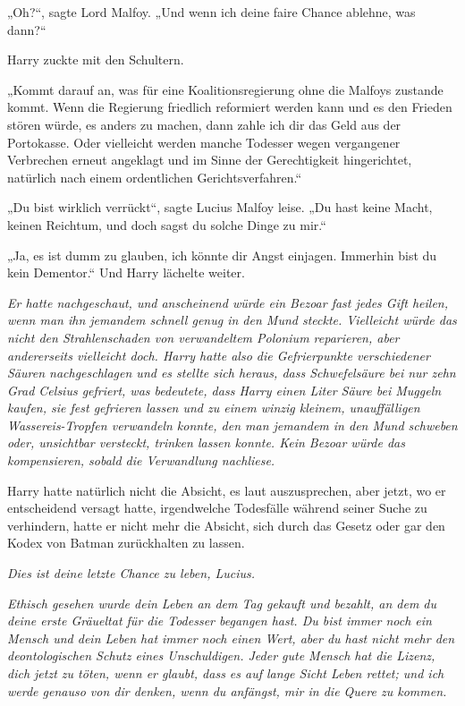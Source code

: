 {„Oh?“, sagte Lord Malfoy. „Und wenn ich deine faire Chance ablehne, was dann?“

Harry zuckte mit den Schultern.

„Kommt darauf an, was für eine Koalitionsregierung ohne die Malfoys zustande kommt. Wenn die Regierung friedlich reformiert werden kann und es den Frieden stören würde, es anders zu machen, dann zahle ich dir das Geld aus der Portokasse. Oder vielleicht werden manche Todesser wegen vergangener Verbrechen erneut angeklagt und im Sinne der Gerechtigkeit hingerichtet, natürlich nach einem ordentlichen Gerichtsverfahren.“

„Du bist wirklich verrückt“, sagte Lucius Malfoy leise. „Du hast keine Macht, keinen Reichtum, und doch sagst du solche Dinge zu mir.“

„Ja, es ist dumm zu glauben, ich könnte dir Angst einjagen. Immerhin bist du kein Dementor.“ Und Harry lächelte weiter.

\emph{Er hatte nachgeschaut, und anscheinend würde ein Bezoar fast jedes Gift heilen, wenn man ihn jemandem schnell genug in den Mund steckte. Vielleicht würde das nicht den Strahlenschaden von verwandeltem Polonium reparieren, aber andererseits vielleicht doch. Harry hatte also die Gefrierpunkte verschiedener Säuren nachgeschlagen und es stellte sich heraus, dass Schwefelsäure bei nur zehn Grad Celsius gefriert, was bedeutete, dass Harry einen Liter Säure bei Muggeln kaufen, sie fest gefrieren lassen und zu einem winzig kleinem, unauffälligen Wassereis-Tropfen verwandeln konnte, den man jemandem in den Mund schweben oder, unsichtbar versteckt, trinken lassen konnte. Kein Bezoar würde das kompensieren, sobald die Verwandlung nachliese.}

Harry hatte natürlich nicht die Absicht, es laut auszusprechen, aber jetzt, wo er entscheidend versagt hatte, irgendwelche Todesfälle während seiner Suche zu verhindern, hatte er nicht mehr die Absicht, sich durch das Gesetz oder gar den Kodex von Batman zurückhalten zu lassen.

\emph{Dies ist deine letzte Chance zu leben, Lucius.}

\emph{Ethisch gesehen wurde dein Leben an dem Tag gekauft und bezahlt, an dem du deine erste Gräueltat für die Todesser begangen hast. Du bist immer noch ein Mensch und dein Leben hat immer noch einen Wert, aber du hast nicht mehr den deontologischen Schutz eines Unschuldigen. Jeder gute Mensch hat die Lizenz, dich jetzt zu töten, wenn er glaubt, dass es auf lange Sicht Leben rettet; und ich werde genauso von dir denken, wenn du anfängst, mir in die Quere zu kommen.}

}
